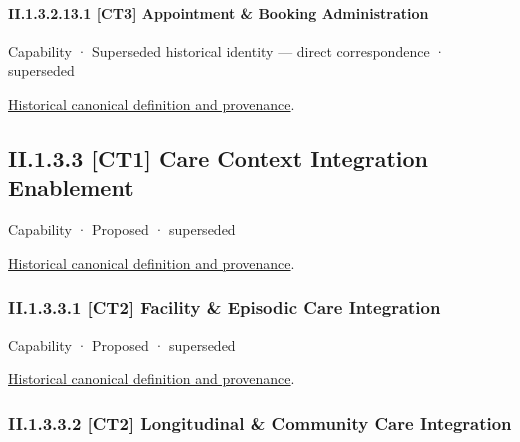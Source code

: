 \paragraph*{II.1.3.2.13.1 [CT3] Appointment \& Booking Administration}
\label{navigation:II.1.3.2.13.1}

\label{element:cdc16dd0f84049f8af3f1ec76f1e1428}
{\small Capability · Superseded historical identity — direct correspondence · superseded}\par
\href{../../../../continuum/strategy/capability/cdc16dd0f84049f8af3f1ec76f1e1428.md}{Historical canonical definition and provenance}.\par
\subsection*{II.1.3.3 [CT1] Care Context Integration Enablement}
\label{navigation:II.1.3.3}

\label{element:a84a7e96e7874a4b87d18c53b1b5cf29}
{\small Capability · Proposed · superseded}\par
\href{../../../../continuum/strategy/capability/a84a7e96e7874a4b87d18c53b1b5cf29.md}{Historical canonical definition and provenance}.\par
\subsubsection*{II.1.3.3.1 [CT2] Facility \& Episodic Care Integration}
\label{navigation:II.1.3.3.1}

\label{element:c1eb24ed7e36417cb426288ff57512c0}
{\small Capability · Proposed · superseded}\par
\href{../../../../continuum/strategy/capability/c1eb24ed7e36417cb426288ff57512c0.md}{Historical canonical definition and provenance}.\par
\subsubsection*{II.1.3.3.2 [CT2] Longitudinal \& Community Care Integration}
\label{navigation:II.1.3.3.2}

